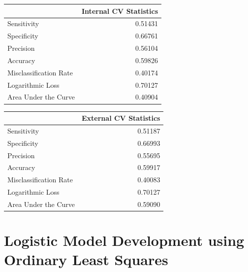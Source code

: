 \documentclass[american,]{article}
\begin{document}
\pagebreak
\begin{table}

\centering
\begin{tabular}{lr}
\toprule
  & Internal CV Statistics\\
\midrule
Sensitivity & 0.51431\\
Specificity & 0.66761\\
Precision & 0.56104\\
Accuracy & 0.59826\\
Misclassification Rate & 0.40174\\
\addlinespace
Logarithmic Loss & 0.70127\\
Area Under the Curve & 0.40904\\
\bottomrule
\end{tabular}
\centering
\begin{tabular}{lr}
\toprule
  & External CV Statistics\\
\midrule
Sensitivity & 0.51187\\
Specificity & 0.66993\\
Precision & 0.55695\\
Accuracy & 0.59917\\
Misclassification Rate & 0.40083\\
\addlinespace
Logarithmic Loss & 0.70127\\
Area Under the Curve & 0.59090\\
\bottomrule
\end{tabular}
\end{table}
\newpage

\hypertarget{logistic-model-development-using-ordinary-least-squares}{%
\section{\texorpdfstring{\textbf{Logistic Model Development using Ordinary Least Squares}}{Logistic Model Development using Ordinary Least Squares}}\label{logistic-model-development-using-ordinary-least-squares}}
\end{document}
